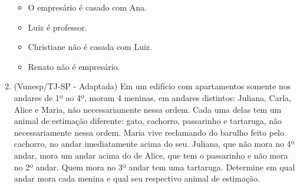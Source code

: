 \documentclass[12pt,a4paper]{article}
\begin{document}
\begin{enumerate}
  \begin{itemize}
    \item O empresário é casado com Ana.
    \item Luiz é professor.
    \item Christiane não é casada com Luiz.
    \item Renato não é empresário.
  \end{itemize}

  \item (Vunesp/TJ-SP - Adaptada) Em um edifício com apartamentos somente nos andares de 1º ao 4º, moram 4 meninas, 
    em andares distintos: Juliana, Carla, Alice e Maria, não necessariamente nessa ordem. 
    Cada uma delas tem um animal de estimação diferente: gato, cachorro, passarinho e tartaruga, 
    não necessariamente nessa ordem. Maria vive reclamando do barulho feito pelo cachorro, 
    no andar imediatamente acima do seu. Juliana, que não mora no 4º andar, mora um andar acima do de Alice, 
    que tem o passarinho e não mora no 2º andar. Quem mora no 3º andar tem uma tartaruga. 
    Determine em qual andar mora cada menina e qual seu respectivo animal de estimação. 

\end{enumerate}

\newpage
\end{document}
